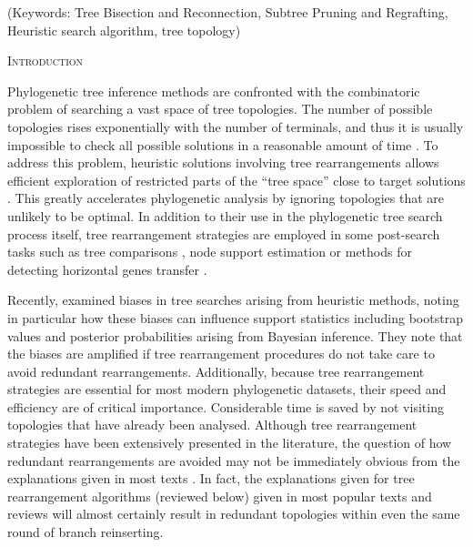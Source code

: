 \documentclass[12pt,letterpaper]{article}
\renewcommand{\section}[1]{%
\bigskip
\begin{center}
\begin{Large}
\normalfont\scshape #1
\medskip
\end{Large}
\end{center}}
\begin{document}
\noindent (Keywords: Tree Bisection and Reconnection, Subtree Pruning and Regrafting, Heuristic search algorithm, tree topology)\\

\vspace{1.5in}

\newpage 

%
%
\section{Introduction}

Phylogenetic tree inference methods are confronted with the combinatoric problem of searching a vast space of tree topologies. 
The number of possible topologies rises exponentially with the number of terminals, and thus it is usually impossible to check all possible solutions in a reasonable amount of time \citep{Felsenstein:1978vh}.
To address this problem, heuristic solutions involving tree rearrangements allows efficient exploration of restricted parts of the ``tree space'' close to target solutions \citep{john2016review}.
This greatly accelerates phylogenetic analysis by ignoring topologies that are unlikely to be optimal.
In addition to their use in the phylogenetic tree search process itself, tree rearrangement strategies are employed in some post-search tasks such as tree comparisons \citep[e.g.][]{allen2001subtree,kuhner2015treComparison}, node support estimation \citep[e.g.][]{goloboff2014bias} or methods for detecting horizontal genes transfer \citep[e.g.][]{mcfadden1995something,bordewich2005computational}.

Recently, \citet{goloboff2014bias} examined biases in tree searches arising from heuristic methods, noting in particular how these biases can influence support statistics including bootstrap values and posterior probabilities arising from Bayesian inference.
They note that the biases are amplified if tree rearrangement %
procedures do not take care to avoid redundant rearrangements. %
Additionally, because tree rearrangement strategies are essential for most modern phylogenetic datasets, their speed and efficiency are of critical importance.
Considerable time is saved by not visiting topologies that have already been analysed.
Although tree rearrangement strategies have been extensively presented in the literature, the question of how redundant rearrangements are avoided may not be immediately obvious from the explanations given in most texts \citep{swofford2003phylogeny,felsenstein2004inferring,wiley2011phylogenetics}.
In fact, the explanations given for tree rearrangement algorithms (reviewed below) given in most popular texts and reviews will almost certainly result in redundant topologies within even the same round of branch reinserting.
\end{document}

